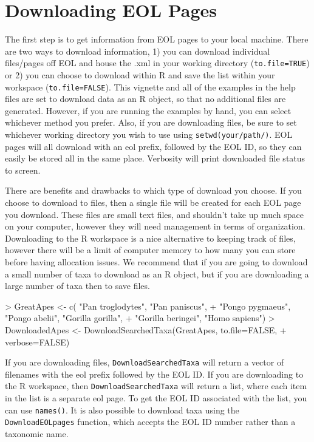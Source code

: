 \documentclass[12pt]{article}
\begin{document}
 \section{Downloading EOL Pages}
The first step is to get information from EOL pages to your local machine. There are two ways to download information, 1) you can download individual files/pages off EOL and house the .xml in your working directory (\texttt{to.file=TRUE}) or 2) you can choose to download within R and save the list within your workspace (\texttt{to.file=FALSE}). This vignette and all of the examples in the help files are set to download data as an R object, so that no additional files are generated. However, if you are running the examples by hand, you can select whichever method you prefer. Also, if you are downloading files, be sure to set whichever working directory you wish to use using \texttt{setwd(your/path/)}. EOL pages will all download with an eol prefix, followed by the EOL ID, so they can easily be stored all in the same place. Verbosity will print downloaded file status to screen. 

There are benefits and drawbacks to which type of download you choose. If you choose to download to files, then a single file will be created for each EOL page you download. These files are small text files, and shouldn't take up much space on your computer, however they will need management in terms of organization. Downloading to the R workspace is a nice alternative to keeping track of files, however there will be a limit of computer memory to how many you can store before having allocation issues. We recommend that if you are going to download a small number of taxa to download as an R object, but if you are downloading a large number of taxa then to save files.  
 
\begin{Schunk}
\begin{Sinput}
> GreatApes <- c( "Pan troglodytes",  "Pan paniscus",
+          "Pongo pygmaeus", "Pongo abelii", "Gorilla gorilla", 
+ 	"Gorilla beringei", "Homo sapiens")
> DownloadedApes <- DownloadSearchedTaxa(GreatApes, to.file=FALSE, 
+ 	verbose=FALSE)
\end{Sinput}
\end{Schunk}

If you are downloading files, \texttt{DownloadSearchedTaxa} will return a vector of filenames with the eol prefix followed by the EOL ID. If you are downloading to the R workspace, then \texttt{DownloadSearchedTaxa} will return a list, where each item in the list is a separate eol page. To get the EOL ID associated with the list, you can use \texttt{names()}. It is also possible to download taxa using the \texttt{DownloadEOLpages} function, which accepts the EOL ID number rather than a taxonomic name. 
\end{document}
